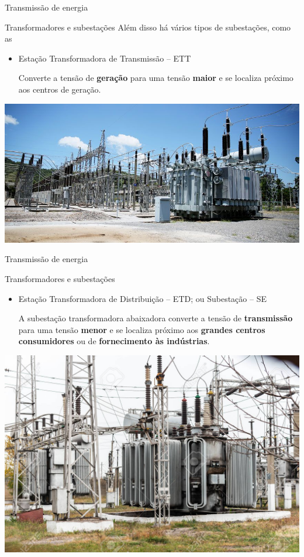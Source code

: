 \begin{frame}{Transmissão de energia}
	\begin{block}{Transformadores e subestações}
		Além disso há vários tipos de subestações, como as
		\begin{itemize}
			\item Estação Transformadora de Transmissão – ETT

			      Converte a tensão de \textbf{geração} para uma tensão \textbf{maior} e se localiza próximo aos centros de geração.
		\end{itemize}
	\end{block}

	\centering
	\includegraphics[width=0.85\linewidth]{Figuras/Ch03/fig13}
\end{frame}


\begin{frame}{Transmissão de energia}
	\begin{block}{Transformadores e subestações}
		\begin{itemize}
			\item Estação Transformadora de Distribuição – ETD; ou Subestação – SE

			      A subestação transformadora abaixadora converte a tensão de \textbf{transmissão} para uma tensão \textbf{menor} e se localiza próximo aos \textbf{grandes centros consumidores} ou de \textbf{fornecimento às indústrias}.
		\end{itemize}
	\end{block}

	\centering
	\includegraphics[width=0.55\linewidth]{Figuras/Ch03/fig14}
\end{frame}


